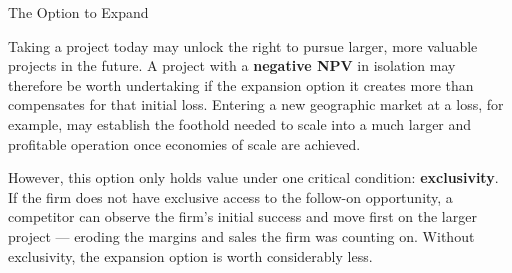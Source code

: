 \documentclass[10pt]{article}
\begin{document}
    \begin{core}{The Option to Expand}

      Taking a project today may unlock the right to pursue larger, more valuable projects in the future. A project with a \textbf{negative NPV} in isolation may therefore be worth undertaking if the expansion option it creates more than compensates for that initial loss. Entering a new geographic market at a loss, for example, may establish the foothold needed to scale into a much larger and profitable operation once economies of scale are achieved.

      However, this option only holds value under one critical condition: \textbf{exclusivity}. If the firm does not have exclusive access to the follow-on opportunity, a competitor can observe the firm's initial success and move first on the larger project — eroding the margins and sales the firm was counting on. Without exclusivity, the expansion option is worth considerably less.


    \end{core}
\end{document}
